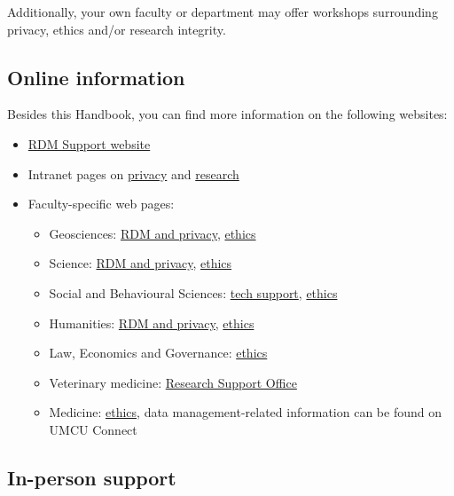 \documentclass[
]{book}
\providecommand{\tightlist}{%
  \setlength{\itemsep}{0pt}\setlength{\parskip}{0pt}}
\begin{document}
Additionally, your own faculty or department may offer workshops surrounding
privacy, ethics and/or research integrity.

\hypertarget{websites}{%
\subsection{Online information}\label{websites}}

Besides this Handbook, you can find more information on the following websites:

\begin{itemize}
\tightlist
\item
  \href{https://www.uu.nl/rdm}{RDM Support website}
\item
  Intranet pages on \href{https://intranet.uu.nl/en/knowledge-base/privacy-at-uu}{privacy} and
  \href{https://intranet.uu.nl/en/knowledgebase/research}{research}
\item
  Faculty-specific web pages:

  \begin{itemize}
  \tightlist
  \item
    Geosciences: \href{https://geo-data-support.sites.uu.nl/}{RDM and privacy},
    \href{https://sciencegeo-erb.sites.uu.nl/}{ethics}
  \item
    Science: \href{https://science-data-support.sites.uu.nl/}{RDM and privacy},
    \href{https://sciencegeo-erb.sites.uu.nl/}{ethics}
  \item
    Social and Behavioural Sciences: \href{https://techsupport.fss.uu.nl/}{tech support},
    \href{https://ferb.sites.uu.nl/}{ethics}
  \item
    Humanities: \href{https://cdh.uu.nl/research/data-management-privacy/}{RDM and privacy},
    \href{https://fetc-gw.wp.hum.uu.nl/}{ethics}
  \item
    Law, Economics and Governance: \href{https://intranet.uu.nl/en/knowledgebase/facultys-ethical-review-committee}{ethics}
  \item
    Veterinary medicine: \href{https://www.uu.nl/en/node/589/onderzoeksbureauresearch-support-office}{Research Support Office}
  \item
    Medicine: \href{https://www.metc-utrecht.nl/en/}{ethics}, data management-related information can be found on UMCU Connect
  \end{itemize}
\end{itemize}

\hypertarget{support}{%
\subsection{In-person support}\label{support}}
\end{document}
